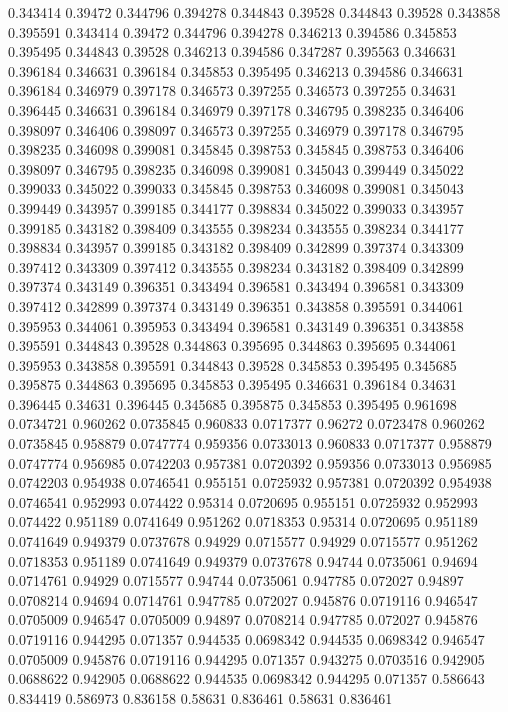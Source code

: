 0.343414 0.39472
0.344796 0.394278
0.344843 0.39528
0.344843 0.39528
0.343858 0.395591
0.343414 0.39472
0.344796 0.394278
0.346213 0.394586
0.345853 0.395495
0.344843 0.39528
0.346213 0.394586
0.347287 0.395563
0.346631 0.396184
0.346631 0.396184
0.345853 0.395495
0.346213 0.394586
0.346631 0.396184
0.346979 0.397178
0.346573 0.397255
0.346573 0.397255
0.34631 0.396445
0.346631 0.396184
0.346979 0.397178
0.346795 0.398235
0.346406 0.398097
0.346406 0.398097
0.346573 0.397255
0.346979 0.397178
0.346795 0.398235
0.346098 0.399081
0.345845 0.398753
0.345845 0.398753
0.346406 0.398097
0.346795 0.398235
0.346098 0.399081
0.345043 0.399449
0.345022 0.399033
0.345022 0.399033
0.345845 0.398753
0.346098 0.399081
0.345043 0.399449
0.343957 0.399185
0.344177 0.398834
0.345022 0.399033
0.343957 0.399185
0.343182 0.398409
0.343555 0.398234
0.343555 0.398234
0.344177 0.398834
0.343957 0.399185
0.343182 0.398409
0.342899 0.397374
0.343309 0.397412
0.343309 0.397412
0.343555 0.398234
0.343182 0.398409
0.342899 0.397374
0.343149 0.396351
0.343494 0.396581
0.343494 0.396581
0.343309 0.397412
0.342899 0.397374
0.343149 0.396351
0.343858 0.395591
0.344061 0.395953
0.344061 0.395953
0.343494 0.396581
0.343149 0.396351
0.343858 0.395591
0.344843 0.39528
0.344863 0.395695
0.344863 0.395695
0.344061 0.395953
0.343858 0.395591
0.344843 0.39528
0.345853 0.395495
0.345685 0.395875
0.344863 0.395695
0.345853 0.395495
0.346631 0.396184
0.34631 0.396445
0.34631 0.396445
0.345685 0.395875
0.345853 0.395495
0.961698 0.0734721
0.960262 0.0735845
0.960833 0.0717377
0.96272 0.0723478
0.960262 0.0735845
0.958879 0.0747774
0.959356 0.0733013
0.960833 0.0717377
0.958879 0.0747774
0.956985 0.0742203
0.957381 0.0720392
0.959356 0.0733013
0.956985 0.0742203
0.954938 0.0746541
0.955151 0.0725932
0.957381 0.0720392
0.954938 0.0746541
0.952993 0.074422
0.95314 0.0720695
0.955151 0.0725932
0.952993 0.074422
0.951189 0.0741649
0.951262 0.0718353
0.95314 0.0720695
0.951189 0.0741649
0.949379 0.0737678
0.94929 0.0715577
0.94929 0.0715577
0.951262 0.0718353
0.951189 0.0741649
0.949379 0.0737678
0.94744 0.0735061
0.94694 0.0714761
0.94929 0.0715577
0.94744 0.0735061
0.947785 0.072027
0.94897 0.0708214
0.94694 0.0714761
0.947785 0.072027
0.945876 0.0719116
0.946547 0.0705009
0.946547 0.0705009
0.94897 0.0708214
0.947785 0.072027
0.945876 0.0719116
0.944295 0.071357
0.944535 0.0698342
0.944535 0.0698342
0.946547 0.0705009
0.945876 0.0719116
0.944295 0.071357
0.943275 0.0703516
0.942905 0.0688622
0.942905 0.0688622
0.944535 0.0698342
0.944295 0.071357
0.586643 0.834419
0.586973 0.836158
0.58631 0.836461
0.58631 0.836461
